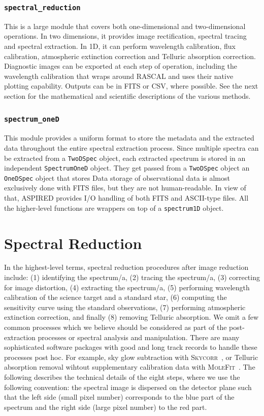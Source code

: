 \documentclass[twocolumn, linenumbers]{aastex631}
\begin{document}
\subsubsection{\texttt{spectral\_reduction}}
This is a large module that covers both one-dimensional and two-dimensional
operations. In two dimensions, it provides image rectification, spectral tracing
and spectral extraction. In 1D, it can perform wavelength calibration, flux
calibration, atmospheric extinction correction and Telluric absorption correction.
Diagnostic images can be exported at each step of operation, including the
wavelength calibration that wraps around \textsc{RASCAL} and uses their native
plotting capability. Outputs can be in FITS or CSV, where possible. See the next
section for the mathematical and scientific descriptions of the various methods.

\subsubsection{\texttt{spectrum_oneD}}
This module provides a uniform format to store the metadata and the extracted
data throughout the entire spectral extraction process. Since multiple spectra
can be extracted from a \verb+TwoDSpec+ object, each extracted spectrum is stored
in an independent \verb+SpectrumOneD+ object. They get passed from a \verb+TwoDSpec+
object an \verb+OneDSpec+ object that stores
Data storage of observational data is almost exclusively done with FITS files,
but they are not human-readable. In view of that, \textsc{ASPIRED} provides I/O handling
of both FITS and ASCII-type files. All the higher-level functions are wrappers on
top of a \texttt{spectrum1D} object.

\section{Spectral Reduction}
In the highest-level terms, spectral reduction procedures after image
reduction include: (1) identifying the spectrum/a, (2) tracing the
spectrum/a, (3) correcting for image distortion, (4) extracting the
spectrum/a, (5) performing wavelength calibration of the science target and a
standard star, (6) computing the sensitivity curve using the standard
observations, (7) performing atmospheric extinction correction,
and finally (8) removing Telluric absorption. We omit a few common
processes which we believe should be considered as part of the
post-extraction processes or spectral analysis and manipulation.
There are many sophisticated software packages with good and long track records
to handle these processes post hoc. For example, sky glow subtraction
with \textsc{Skycorr}~\citep{2014A&A...567A..25N}, or Telluric
absorption removal wihtout supplementary calibration data with
\textsc{MoleFit}~\citep{2015A&A...576A..77S, 2015A&A...576A..78K}.
The following describes the technical details of the eight steps,
where we use the following convention: the spectral image is dispersed
on the detector plane such that the left side (small pixel number) corresponds to
the blue part of the spectrum and the right side (large pixel number) to the red part.
\end{document}
